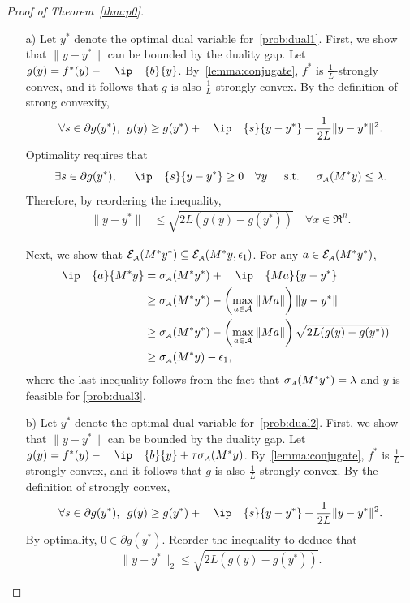 \begin{proof}[Proof of Theorem~\ref{thm:p0}]
    \begin{itemize}
      \item[a)] Let $y^*$ denote the optimal dual variable for~\eqref{prob:dual1}. First, we show that $\|y - y^*\|$ can be bounded by the duality gap. Let $g(y) = f^*(y) - \ip{b}{y}$. By~\autoref{lemma:conjugate}, $f^*$ is $\frac{1}{L}$-strongly convex, and it follows that $g$ is also $\frac{1}{L}$-strongly convex. By the definition of strong convexity, 
      \[\forall s \in \partial g(y^*), \enspace g(y) \geq g(y^*) + \ip{s}{y- y^*} + \frac{1}{2L}\|y - y^*\|^2.
      \]
      Optimality requires that 
      \[\exists s \in \partial g(y^*), \enspace \ip{s}{y- y^*} \geq 0 \quad \forall y \enspace\text{s.t.}\enspace \sigma\As(M^*y)\leq\lambda.\]
      Therefore, by reordering the inequality,
      \begin{align}
         \|y - y^*\| & \leq \sqrt{2L(g(y) - g(y^*))}
         \quad \forall x \in \Re^n.
      \end{align} 
    
      Next, we show that $\mathcal{E}_{\scriptscriptstyle\mathcal{A}}(M^*y^*) \subseteq \mathcal{E}_{\scriptscriptstyle\mathcal{A}}(M^*y, \epsilon_1)$. For any $a \in \mathcal{E}_{\scriptscriptstyle\mathcal{A}}(M^*y^*)$, 
      \begin{align*}
        \ip{a}{M^*y} &= \sigma\As(M^*y^*) + \ip{Ma}{y - y^*}
        \\&\geq \sigma\As(M^*y^*) - \left(\max\limits_{a \in \Ascr}\|Ma\|\right)\|y - y^*\|
        \\&\geq \sigma\As(M^*y^*) - \left(\max\limits_{a \in \Ascr}\|Ma\|\right)\sqrt{2L(g(y) - g(y^*))}
        \\&\geq \sigma\As(M^*y) - \epsilon_1,
      \end{align*}
      where the last inequality follows from the fact that $\sigma_{\scriptscriptstyle\mathcal{A}}(M^*y^*) = \lambda$ and $y$ is feasible for \eqref{prob:dual3}. 
    
      \item[b)] Let $y^*$ denote the optimal dual variable for~\eqref{prob:dual2}. First, we show that $\|y - y^*\|$ can be bounded by the duality gap. Let $g(y) = f^*(y) - \ip{b}{y} + \tau\sigma\As(M^*y)$. By~\autoref{lemma:conjugate}, $f^*$ is $\frac{1}{L}$-strongly convex, and it follows that $g$ is also $\frac{1}{L}$-strongly convex. 
      By the definition of strongly convex, 
      \[\forall s \in \partial g(y^*), \enspace g(y) \geq g(y^*) + \ip{s}{y- y^*} + \frac{1}{2L}\|y - y^*\|^2.\]
      By optimality, $0 \in \partial g(y^*)$. Reorder the inequality to deduce that
      \[\|y - y^*\|_2 \leq \sqrt{2L(g(y) - g(y^*))}.\]
    

\end{itemize}
\end{proof}

